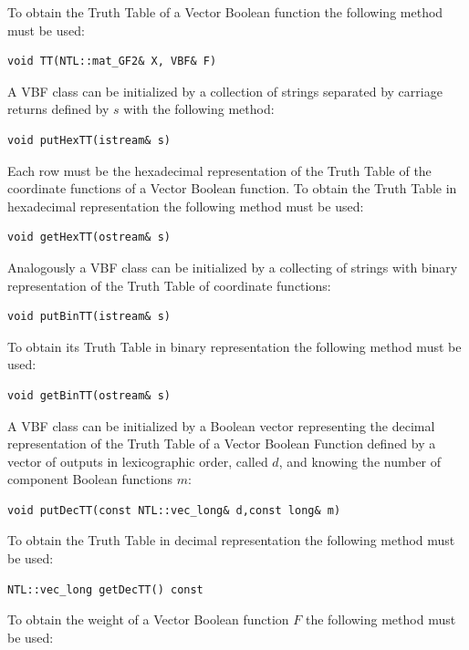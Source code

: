To obtain the Truth Table of a Vector Boolean function the following method must be used:

\begin{verbatim}
void TT(NTL::mat_GF2& X, VBF& F)
\end{verbatim}

A VBF class can be initialized by a collection of strings separated by carriage returns defined by $s$ with the following method: 

\begin{verbatim}
void putHexTT(istream& s)
\end{verbatim}

Each row must be the hexadecimal representation of the Truth Table of the coordinate functions of a Vector Boolean function. To obtain the Truth Table in hexadecimal representation the following method must be used:

\begin{verbatim}
void getHexTT(ostream& s)
\end{verbatim}

Analogously a VBF class can be initialized by a collecting of strings with binary representation of the Truth Table of coordinate functions:

\begin{verbatim}
void putBinTT(istream& s)
\end{verbatim}

To obtain its Truth Table in binary representation the following method must be used:

\begin{verbatim}
void getBinTT(ostream& s)
\end{verbatim}

A VBF class can be initialized by a Boolean vector representing the decimal representation of the Truth Table of a Vector Boolean Function defined by a vector of outputs in lexicographic order, called $d$, and knowing the number of component Boolean functions $m$:

\begin{verbatim}
void putDecTT(const NTL::vec_long& d,const long& m)
\end{verbatim}

To obtain the Truth Table in decimal representation the following method must be used:

\begin{verbatim}
NTL::vec_long getDecTT() const
\end{verbatim}

To obtain the weight of a Vector Boolean function $F$ the following method must be used:

